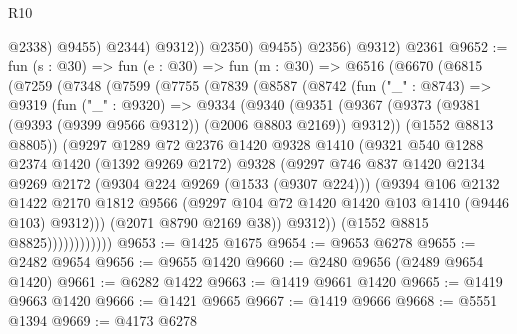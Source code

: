 \begin{lexlean}{R10}
\begin{coremodule}
                      @2338)
                    @9455)
                  @2344)
                @9312))
            @2350)
          @9455)
        @2356)
      @9312)
    @2361
@9652 := fun (s : @30) =>
  fun (e : @30) =>
  fun (m : @30) =>
  @6516
    (@6670
      (@6815
        (@7259
          (@7348
            (@7599
              (@7755
                (@7839
                  (@8587
                    (@8742
                      (fun ("_" : @8743) =>
                      @9319
                        (fun ("_" : @9320) =>
                        @9334
                          (@9340
                            (@9351
                              (@9367
                                (@9373
                                  (@9381 (@9393 (@9399 @9566 @9312)) (@2006 @8803 @2169))
                                  @9312))
                              (@1552 @8813 @8805))
                            (@9297
                              @1289
                              @72
                              @2376
                              @1420
                              @9328
                              @1410
                              (@9321
                                @540
                                @1288
                                @2374
                                @1420
                                (@1392 @9269 @2172)
                                @9328
                                (@9297
                                  @746
                                  @837
                                  @1420
                                  @2134
                                  @9269
                                  @2172
                                  (@9304 @224 @9269 (@1533 (@9307 @224)))
                                  (@9394
                                    @106
                                    @2132
                                    @1422
                                    @2170
                                    @1812
                                    @9566
                                    (@9297 @104 @72 @1420 @1420 @103 @1410 (@9446 @103) @9312)))
                                (@2071 @8790 @2169 @38))
                              @9312))
                          (@1552 @8815 @8825))))))))))))
@9653 := @1425 @1675
@9654 := @9653 @6278
@9655 := @2482 @9654
@9656 := @9655 @1420
@9660 := @2480 @9656 (@2489 @9654 @1420)
@9661 := @6282 @1422
@9663 := @1419 @9661 @1420
@9665 := @1419 @9663 @1420
@9666 := @1421 @9665
@9667 := @1419 @9666
@9668 := @5551 @1394
@9669 := @4173 @6278

\end{coremodule}
\end{lexlean}
